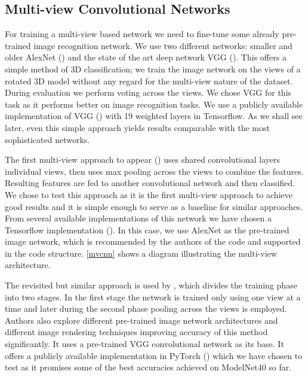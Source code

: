 \subsection{Multi-view Convolutional Networks}
For training a multi-view based network we need to fine-tune some already pre-trained image recognition network. We use two different networks: smaller and older AlexNet (\cite{krizhevsky_imagenet_2012}) and the state of the art deep network VGG (\cite{simonyan_very_2014}). This offers a simple method of 3D classification; we train the image network on the views of a rotated 3D model without any regard for the multi-view nature of the dataset. During evaluation we perform voting across the views. We chose VGG for this task as it performs better on image recognition tasks. We use a publicly available implementation of VGG (\cite{machrisaa_vgg_2017}) with 19 weighted layers in Tensorflow. As we shall see later, even this simple approach yields results comparable with the most sophisticated networks.
\par
The first multi-view approach to appear (\cite{su_multi-view_2015}) uses shared convolutional layers individual views, then uses max pooling across the views to combine the features. Resulting features are fed to another convolutional network and then classified. We chose to test this approach as it is the first multi-view approach to achieve good results and it is simple enough to serve as a baseline for similar approaches. From several available implementations of this network we have chosen a Tensorflow implementation (\cite{lee_multi-view_2016}). In this case, we use AlexNet as the pre-trained image network, which is recommended by the authors of the code and supported in the code structure. \autoref{mvcnn} shows a diagram illustrating the multi-view architecture. \par
The revisited but similar approach is used by \cite{su_deeper_2018}, which divides the training phase into two stages. In the first stage the network is trained only using one view at a time and later during the second phase pooling across the views is employed. Authors also explore different pre-trained image network architectures and different image rendering techniques improving accuracy of this method significantly. It uses a pre-trained VGG convolutional network as its base. It offers a publicly available implementation in PyTorch (\cite{su_multi-view_2018}) which we have chosen to test as it promises some of the best accuracies achieved on ModelNet40 so far.



